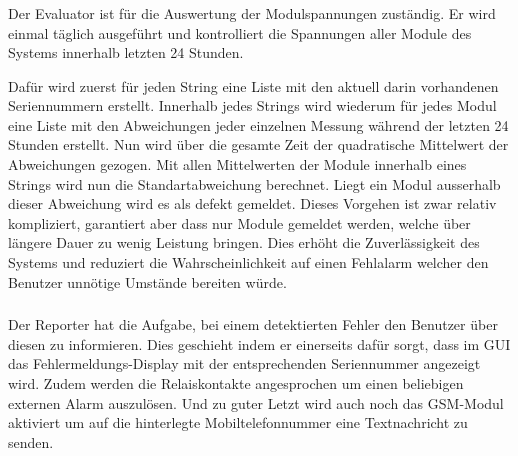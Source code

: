 \subsubsection{}
\label{subsubsec:software:master:implementation:evaluator}

Der  Evaluator ist  f\"ur die  Auswertung der  Modulspannungen zust\"andig. Er
wird  einmal  t\"aglich ausgef\"uhrt  und  kontrolliert  die Spannungen  aller
Module des Systems innerhalb letzten 24 Stunden.

Daf\"ur  wird zuerst  f\"ur  jeden String  eine Liste  mit  den aktuell  darin
vorhandenen  Seriennummern  erstellt. Innerhalb  jedes Strings  wird  wiederum
f\"ur  jedes Modul  eine Liste  mit den  Abweichungen jeder  einzelnen Messung
w\"ahrend der  letzten 24 Stunden  erstellt. Nun wird \"uber die  gesamte Zeit
der quadratische  Mittelwert der Abweichungen gezogen. Mit  allen Mittelwerten
der   Module  innerhalb   eines  Strings   wird  nun   die  Standartabweichung
berechnet. Liegt ein  Modul ausserhalb  dieser Abweichung  wird es  als defekt
gemeldet. Dieses Vorgehen  ist zwar relativ kompliziert,  garantiert aber dass
nur Module  gemeldet werden, welche  \"uber l\"angere Dauer zu  wenig Leistung
bringen. Dies  erh\"oht die  Zuverl\"assigkeit des  Systems und  reduziert die
Wahrscheinlichkeit  auf  einen  Fehlalarm   welcher  den  Benutzer  unn\"otige
Umst\"ande bereiten w\"urde.


\subsubsection{}
\label{subsubsec:software:master:implementation:reporter}

Der  Reporter hat  die Aufgabe,  bei  einem detektierten  Fehler den  Benutzer
\"uber  diesen  zu informieren. Dies  geschieht  indem  er einerseits  daf\"ur
sorgt,  dass   im  GUI  das  Fehlermeldungs-Display   mit  der  entsprechenden
Seriennummer angezeigt  wird. Zudem werden die Relaiskontakte  angesprochen um
einen beliebigen  externen Alarm  auszul\"osen. Und zu  guter Letzt  wird auch
noch das  GSM-Modul aktiviert um  auf die hinterlegte  Mobiltelefonnummer eine
Textnachricht zu senden.
